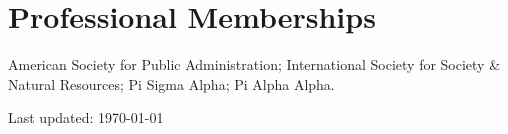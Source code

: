 \documentclass[12pt,letterpaper]{article}
\begin{document}
\section*{Professional Memberships}
American Society for Public Administration; International Society for Society \& Natural Resources; Pi Sigma Alpha; Pi Alpha Alpha.

\vfill
\begin{center}
\begin{small}
Last updated: \today
\end{small}
\end{center}
\end{document}
